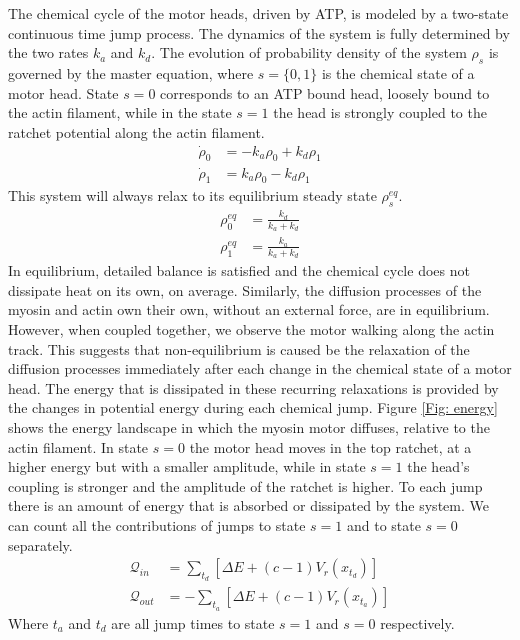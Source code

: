 \documentclass[aps,pre,twocolumn,showpacs,showkeys,a4paper]{revtex4}
\begin{document}
The chemical cycle of the motor heads, driven by ATP, is modeled by a two-state continuous time jump process. 
The dynamics of the system is fully determined by the two rates $k_a$ and $k_d$. 
The evolution of probability density of the system $\rho_s$ is governed by the master equation, where $s = \{0,1\}$ is the chemical state of a motor head. 
State $s=0$ corresponds to an ATP bound head, loosely bound to the actin filament, while in the state $s=1$ the head is strongly coupled to the ratchet potential along the actin filament.
\begin{align*}
\dot{\rho}_0 &= -k_a \rho_0 + k_d \rho_1 \\
\dot{\rho}_1 &= k_a \rho_0 - k_d \rho_1 
\end{align*}
This system will always relax to its equilibrium steady state $\rho^{eq}_s$.
\begin{align*}
\rho^{eq}_0 &= \frac{k_d}{k_a+k_d}\\
\rho^{eq}_1 &= \frac{k_a}{k_a+k_d} 
\end{align*}
In equilibrium, detailed balance is satisfied and the chemical cycle does not dissipate heat on its own, on average.
Similarly, the diffusion processes of the myosin and actin own their own, without an external force, are in equilibrium.
However, when coupled together, we observe the motor walking along the actin track. 
This suggests that non-equilibrium is caused be the relaxation of the diffusion processes immediately after each change in the chemical state of a motor head. 
The energy that is dissipated in these recurring relaxations is provided by the changes in potential energy during each chemical jump. 
Figure \ref{Fig: energy} shows the energy landscape in which the myosin motor diffuses, relative to the actin filament. 
In state $s=0$ the motor head moves in the top ratchet, at a higher energy but with a smaller amplitude, while in state $s=1$ the head's coupling is stronger and the amplitude of the ratchet is higher. 
To each jump there is an amount of energy that is absorbed or dissipated by the system. 
We can count all the contributions of jumps to state $s=1$ and to state $s=0$ separately.
\begin{align}
\mathcal Q_{in} &= \sum_{t_d} \left[ \Delta E + (c-1) V_r(x_{t_d}) \right]  \label{q_in} \\
\mathcal Q_{out} &= -\sum_{t_a} \left[ \Delta E + (c-1) V_r(x_{t_a}) \right]  \label{q_out}
\end{align}
Where $t_a$ and $t_d$ are all jump times to state $s=1$ and $s=0$ respectively. 
\end{document}
